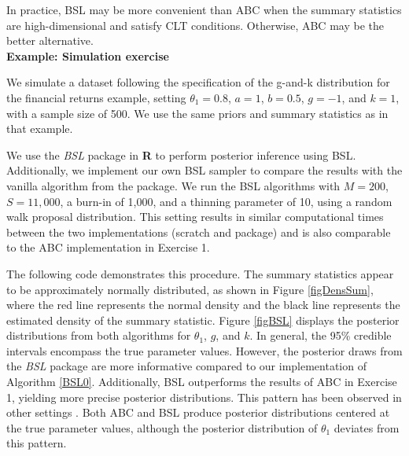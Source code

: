 In practice, BSL may be more convenient than ABC when the summary statistics are high-dimensional and satisfy CLT conditions. Otherwise, ABC may be the better alternative.\\    

\textbf{Example: Simulation exercise}

We simulate a dataset following the specification of the g-and-k distribution for the financial returns example, setting $\theta_1 = 0.8$, $a = 1$, $b = 0.5$, $g = -1$, and $k = 1$, with a sample size of 500. We use the same priors and summary statistics as in that example.

We use the \textit{BSL} package in \textbf{R} to perform posterior inference using BSL. Additionally, we implement our own BSL sampler to compare the results with the vanilla algorithm from the package. We run the BSL algorithms with $M=200$, $S=11,000$, a burn-in of 1,000, and a thinning parameter of 10, using a random walk proposal distribution. This setting results in similar computational times between the two implementations (scratch and package) and is also comparable to the ABC implementation in Exercise 1.

The following code demonstrates this procedure. The summary statistics appear to be approximately normally distributed, as shown in Figure \ref{figDensSum}, where the red line represents the normal density and the black line represents the estimated density of the summary statistic. Figure \ref{figBSL} displays the posterior distributions from both algorithms for $\theta_1$, $g$, and $k$. In general, the 95\% credible intervals encompass the true parameter values. However, the posterior draws from the \textit{BSL} package are more informative compared to our implementation of Algorithm \ref{BSL0}. Additionally, BSL outperforms the results of ABC in Exercise 1, yielding more precise posterior distributions. This pattern has been observed in other settings \cite{drovandi2022comparison,martin2024approximating}. Both ABC and BSL produce posterior distributions centered at the true parameter values, although the posterior distribution of $\theta_1$ deviates from this pattern.

